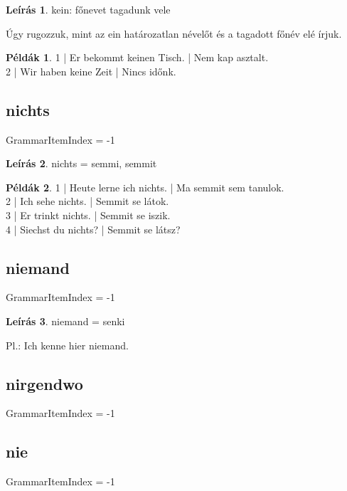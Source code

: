 \documentclass{article}
\theoremstyle{definition}
\newtheorem*{exmp}{Példák}
\newtheorem*{desc}{Leírás}
\begin{document}
\begin{desc}
kein: főnevet tagadunk vele

Úgy rugozzuk, mint az ein határozatlan névelőt és a tagadott főnév elé írjuk.
\end{desc}

\begin{exmp}
1 | Er bekommt keinen Tisch. | Nem kap asztalt.\\
2 | Wir haben keine Zeit | Nincs időnk.\\
\end{exmp}

\subsection{nichts}

GrammarItemIndex = -1

\begin{desc}
nichts = semmi, semmit
\end{desc}

\begin{exmp}
1 | Heute lerne ich nichts. | Ma semmit sem tanulok.\\
2 | Ich sehe nichts. | Semmit se látok.\\
3 | Er trinkt nichts. | Semmit se iszik.\\
4 | Siechst du nichts? | Semmit se látsz?\\
\end{exmp}

\subsection{niemand}

GrammarItemIndex = -1

\begin{desc}
niemand = senki

Pl.: Ich kenne hier niemand.
\end{desc}

\subsection{nirgendwo}

GrammarItemIndex = -1

\subsection{nie}

GrammarItemIndex = -1
\end{document}
